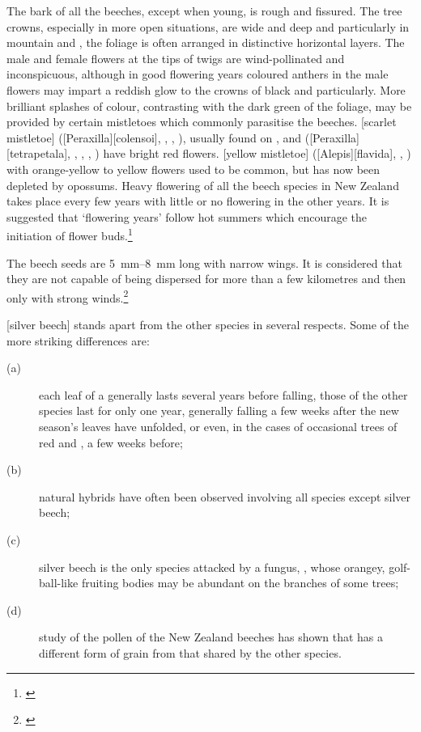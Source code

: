 The bark of all the beeches, except when young, is rough and fissured.
The tree crowns, especially in more open situations, are wide and deep and particularly in mountain and , the foliage is often arranged in distinctive horizontal layers.
The male and female flowers at the tips of twigs are wind-pollinated and inconspicuous, although in good flowering years coloured anthers in the male flowers may impart a reddish glow to the crowns of black and  particularly.
More brilliant splashes of colour, contrasting with the dark green of the foliage, may be provided by certain mistletoes which commonly parasitise the beeches.
[scarlet mistletoe] ([Peraxilla][colensoi], , , ), usually found on , and  ([Peraxilla][tetrapetala], , , , ) have bright red flowers.
[yellow mistletoe] ([Alepis][flavida], , ) with orange-yellow to yellow flowers used to be common, but has now been depleted by opossums.
Heavy flowering of all the beech species in New Zealand takes place every few years with little or no flowering in the other years.
It is suggested that `flowering years' follow hot summers which encourage the initiation of flower buds.\footnote{\cite{poole1948flowering}}

The beech seeds are \SIrange{5}{8}{\milli\metre} long with narrow wings.
It is considered that they are not capable of being dispersed for more than a few kilometres and then only with strong winds.\footnote{\cite{preest1963dispersal}}

[silver beech] stands apart from the other species in several respects.
Some of the more striking differences are:

\begin{description}
	\item[{(a)}]each leaf of a  generally lasts several years before falling, those of the other species last for only one year, generally falling a few weeks after the new season's leaves have unfolded, or even, in the cases of occasional trees of red and , a few weeks before;
	\item[{(b)}]natural hybrids have often been observed involving all species except silver beech;
	\item[{(c)}]silver beech is the only species attacked by a fungus, , whose orangey, golf-ball-like fruiting bodies may be abundant on the branches of some trees;
	\item[{(d)}]study of the pollen of the New Zealand beeches has shown that  has a different form of grain from that shared by the other species.
\end{description}

